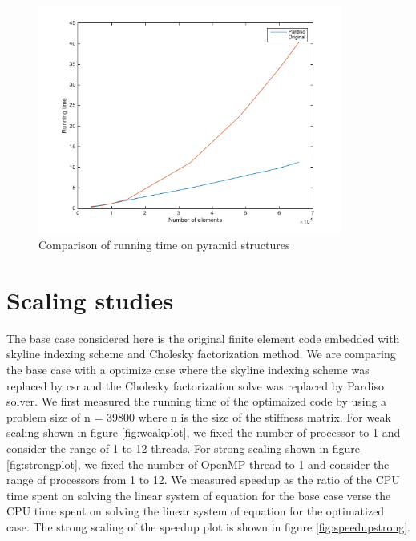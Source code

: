\documentclass[11pt]{article}
\begin{document}
\begin{figure}[H]
\begin{center}

\includegraphics[width=10cm]{pyrplot}
\caption{Comparison of running time on pyramid structures}
\label{fig:pyr_comp}
\end{center}
\end{figure}


\section{Scaling studies}\label{sec:scaling}
The base case considered here is the original finite element code embedded with skyline indexing scheme and Cholesky factorization method. We are comparing the base case with a optimize case where the skyline indexing scheme was replaced by csr and the Cholesky factorization solve was replaced by Pardiso solver. We first measured the running time of the optimaized code by using a problem size of n = 39800 where n is the size of the stiffness matrix. For weak scaling shown in figure \ref{fig:weakplot}, we fixed the number of processor to 1 and consider the range of 1 to 12 threads.  For strong scaling shown in figure \ref{fig:strongplot}, we fixed the number of OpenMP thread to 1 and consider the range of processors from 1 to 12. We measured speedup as the ratio of the CPU time spent on solving the linear system of equation for the base case verse the CPU time spent on solving the linear system of equation for the optimatized case. The strong scaling of the speedup plot is shown in figure \ref{fig:speedupstrong}. \\
\end{document}
